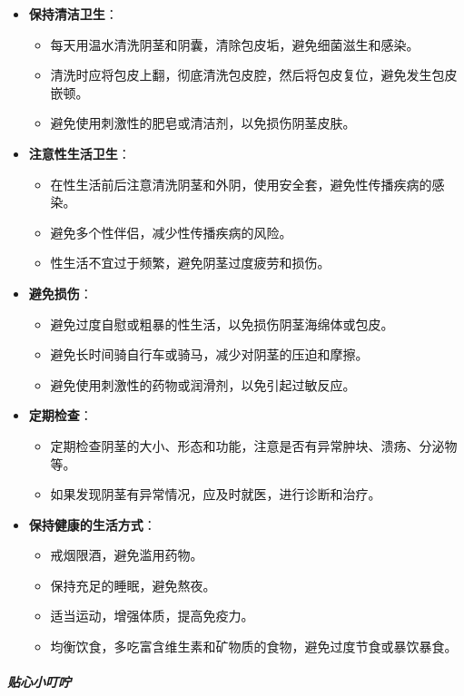 \begin{itemize}
\item \textbf{保持清洁卫生}：
  \begin{itemize}
  \item 每天用温水清洗阴茎和阴囊，清除包皮垢，避免细菌滋生和感染。
  \item 清洗时应将包皮上翻，彻底清洗包皮腔，然后将包皮复位，避免发生包皮嵌顿。
  \item 避免使用刺激性的肥皂或清洁剂，以免损伤阴茎皮肤。
  \end{itemize}
\item \textbf{注意性生活卫生}：
  \begin{itemize}
  \item 在性生活前后注意清洗阴茎和外阴，使用安全套，避免性传播疾病的感染。
  \item 避免多个性伴侣，减少性传播疾病的风险。
  \item 性生活不宜过于频繁，避免阴茎过度疲劳和损伤。
  \end{itemize}
\item \textbf{避免损伤}：
  \begin{itemize}
  \item 避免过度自慰或粗暴的性生活，以免损伤阴茎海绵体或包皮。
  \item 避免长时间骑自行车或骑马，减少对阴茎的压迫和摩擦。
  \item 避免使用刺激性的药物或润滑剂，以免引起过敏反应。
  \end{itemize}
\item \textbf{定期检查}：
  \begin{itemize}
  \item 定期检查阴茎的大小、形态和功能，注意是否有异常肿块、溃疡、分泌物等。
  \item 如果发现阴茎有异常情况，应及时就医，进行诊断和治疗。
  \end{itemize}
\item \textbf{保持健康的生活方式}：
  \begin{itemize}
  \item 戒烟限酒，避免滥用药物。
  \item 保持充足的睡眠，避免熬夜。
  \item 适当运动，增强体质，提高免疫力。
  \item 均衡饮食，多吃富含维生素和矿物质的食物，避免过度节食或暴饮暴食。
  \end{itemize}
\end{itemize}

\subparagraph{贴心小叮咛}

